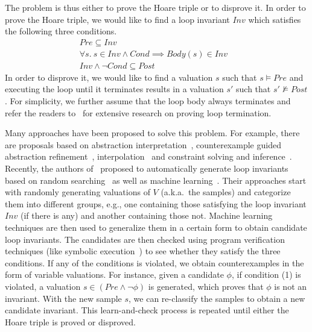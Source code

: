 The problem is thus either to prove the Hoare triple or to disprove it. In order to prove the Hoare triple, we would like to find a loop invariant $\mathit{Inv}$ which satisfies the following three conditions.
\begin{align}
    & Pre \subseteq Inv && \label{inv:pre} \\
    &\forall s.~s \in Inv \land Cond \implies Body(s) \in Inv && \label{inv:loop} \\
    & Inv \land \neg Cond \subseteq Post && \label{inv:post}
\end{align}
In order to disprove it, we would like to find a valuation $s$ such that $s \models \mathit{Pre}$ and executing the loop until it terminates results in a valuation $s'$ such that $s' \not \models \mathit{Post}$. For simplicity, we further assume that the loop body always terminates and refer the readers to~\cite{Domagoj:FAC:2013,LeQC:PLDI:15,Hong:ASE:2015} %
for extensive research on proving loop termination.

Many approaches have been proposed to solve this problem.
For example, there are proposals based on abstraction interpretation~\cite{cousot1978automatic,mine2006octagon,karr1976affine,vincent2009subpolyhedra},
 counterexample guided abstraction refinement~\cite{henzinger2003software,thomas2001slam,edmund2003counterexample}, interpolation~\cite{kenneth2010lazy,thomas2004abstractions,kenneth2003interpolation,Kenneth2006lazy} and constraint solving and inference~\cite{ashutosh2009invgen,michael2003linear,sumit2009constraint}.
Recently, the authors of~\cite{sharma2012interpolants,sharma2013verification,DBLP:conf/esop/0001GHALN13,sharma2014invariant} proposed to automatically generate loop invariants based on random searching~\cite{sharma2014invariant} as well as machine learning~\cite{sharma2012interpolants}.
Their approaches start with randomly generating valuations of $V$ (a.k.a.~the samples) and categorize them into different groups, e.g., one containing those satisfying the loop invariant $\mathit{Inv}$ (if there is any) and another containing those not. Machine learning techniques are then used to generalize them in a certain form to obtain candidate loop invariants.
The candidates are then checked using program verification techniques (like symbolic execution~\cite{symbolic}) to see whether they satisfy the three conditions. If any of the conditions is violated, we obtain counterexamples in the form of variable valuations.
For instance, given a candidate $\phi$, if condition (1) is violated, a valuation $s \in (Pre \land \neg \phi)$ is generated, which proves that $\phi$ is not an invariant.
With the new sample $s$, we can re-classify the samples to obtain a new candidate invariant. This learn-and-check process is repeated until either the Hoare triple is proved or disproved.

